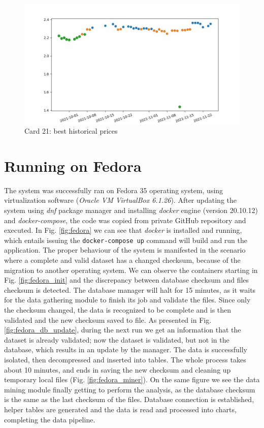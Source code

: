 \begin{figure}
    \centering
    \includegraphics[width=\textwidth]{figures/card_21.jpg}
    \caption{Card 21: best historical prices}
    \label{fig:card_21}
\end{figure}

\section{Running on Fedora}
The system was successfully ran on Fedora 35 operating system, using virtualization software (\textit{Oracle VM VirtualBox 6.1.26}). After updating the system using \textit{dnf} package manager and installing \textit{docker} engine (version 20.10.12) and \textit{docker-compose}, the code was copied from private GitHub repository and executed. In Fig. \ref{fig:fedora} we can see that \textit{docker} is installed and running, which entails issuing the \texttt{docker-compose up} command will build and run the application. The proper behaviour of the system is manifested in the scenario where a complete and valid dataset has a changed checksum, because of the migration to another operating system. We can observe the containers starting in Fig. \ref{fig:fedora_init} and the discrepancy between database checksum and files checksum is detected. The database manager will halt for 15 minutes, as it waits for the data gathering module to finish its job and validate the files. Since only the checksum changed, the data is recognized to be complete and is then validated and the new checksum saved to file. As presented in Fig. \ref{fig:fedora_db_update}, during the next run we get an information that the dataset is already validated; now the dataset is validated, but not in the database, which results in an update by the manager. The data is successfully isolated, then decompressed and inserted into tables. The whole process takes about 10 minutes, and ends in saving the new checksum and cleaning up temporary local files (Fig. \ref{fig:fedora_miner}). On the same figure we see the data mining module finally getting to perform the analysis, as the database checksum is the same as the last checksum of the files. Database connection is established, helper tables are generated and the data is read and processed into charts, completing the data pipeline.

